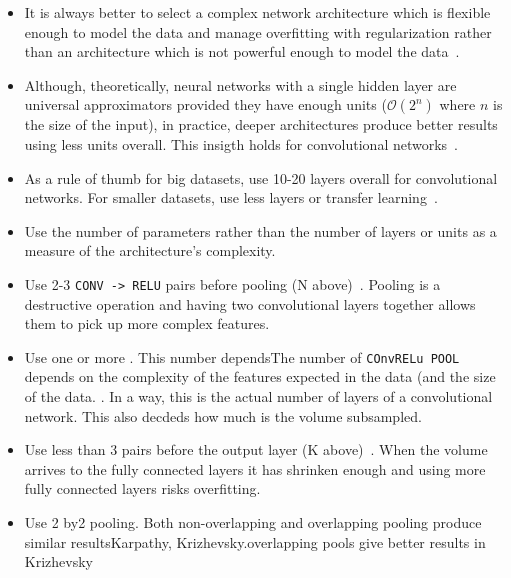 \begin{itemize}
	\item It is always better to select a complex network architecture which is flexible enough to model the data and manage overfitting with regularization rather than 
	an architecture which is not powerful enough to model the data~\cite{Ng2014, Krizhevsky2012}. 

	\item Although, theoretically, neural networks with a single hidden layer are universal approximators provided they have enough units ($\mathcal{O}(2^n)$ where $n$ is the size of the input), in practice, deeper architectures produce better results using less units overall. This insigth holds for convolutional networks~\cite{Bengio2014}.

	\item As a rule of thumb for big datasets, use 10-20 layers overall for convolutional networks. For smaller datasets, use less layers or transfer learning~\cite{Karpathy2015}.

	\item Use the number of parameters rather than the number of layers or units as a measure of the architecture's complexity.

	\item Use 2-3 \texttt{CONV -> RELU} pairs before pooling (N above)~\cite{Karpathy2015}. Pooling is a destructive operation and having two convolutional layers together allows them to pick up more complex features.

	\item Use one or more . This number dependsThe number of \texttt{COnvRELu POOL} depends on the complexity of the features expected in the data (and the size of the data. . In a way, this is the actual number of layers of a convolutional network. This also decdeds how much is the volume subsampled.

	\item Use less than 3  pairs before the output layer (K above)~\cite{Karpathy2015}. When the volume arrives to the fully connected layers it has shrinken enough and using more fully connected layers risks overfitting.






	\item Use 2 by2 pooling. Both non-overlapping and overlapping pooling produce similar resultsKarpathy, Krizhevsky.overlapping pools give better results in Krizhevsky


\end{itemize}

